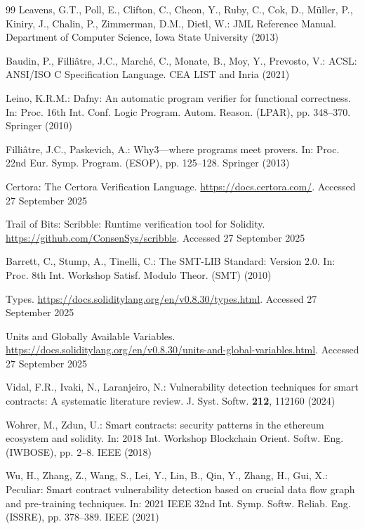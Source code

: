 \documentclass[pdflatex,sn-basic]{sn-jnl}%
\theoremstyle{thmstyleone}%
\theoremstyle{thmstyletwo}%
\theoremstyle{thmstylethree}%
\begin{document}
\begin{thebibliography}{99}
 Leavens, G.T., Poll, E., Clifton, C., Cheon, Y., Ruby, C., Cok, D., Müller, P., Kiniry, J., Chalin, P., Zimmerman, D.M., Dietl, W.: JML Reference Manual. Department of Computer Science, Iowa State University (2013)

 Baudin, P., Filliâtre, J.C., Marché, C., Monate, B., Moy, Y., Prevosto, V.: ACSL: ANSI/ISO C Specification Language. CEA LIST and Inria (2021)

 Leino, K.R.M.: Dafny: An automatic program verifier for functional correctness. In: Proc. 16th Int. Conf. Logic Program. Autom. Reason. (LPAR), pp. 348--370. Springer (2010)

 Filliâtre, J.C., Paskevich, A.: Why3—where programs meet provers. In: Proc. 22nd Eur. Symp. Program. (ESOP), pp. 125--128. Springer (2013)

 Certora: The Certora Verification Language. \url{https://docs.certora.com/}. Accessed 27 September 2025

 Trail of Bits: Scribble: Runtime verification tool for Solidity. \url{https://github.com/ConsenSys/scribble}. Accessed 27 September 2025

 Barrett, C., Stump, A., Tinelli, C.: The SMT-LIB Standard: Version 2.0. In: Proc. 8th Int. Workshop Satisf. Modulo Theor. (SMT) (2010)

 Types. \url{https://docs.soliditylang.org/en/v0.8.30/types.html}. Accessed 27 September 2025

 Units and Globally Available Variables. \url{https://docs.soliditylang.org/en/v0.8.30/units-and-global-variables.html}. Accessed 27 September 2025

 Vidal, F.R., Ivaki, N., Laranjeiro, N.: Vulnerability detection techniques for smart contracts: A systematic literature review. J. Syst. Softw. \textbf{212}, 112160 (2024)

 Wohrer, M., Zdun, U.: Smart contracts: security patterns in the ethereum ecosystem and solidity. In: 2018 Int. Workshop Blockchain Orient. Softw. Eng. (IWBOSE), pp. 2--8. IEEE (2018)

 Wu, H., Zhang, Z., Wang, S., Lei, Y., Lin, B., Qin, Y., Zhang, H., Gui, X.: Peculiar: Smart contract vulnerability detection based on crucial data flow graph and pre-training techniques. In: 2021 IEEE 32nd Int. Symp. Softw. Reliab. Eng. (ISSRE), pp. 378--389. IEEE (2021)


\end{thebibliography}
\end{document}
